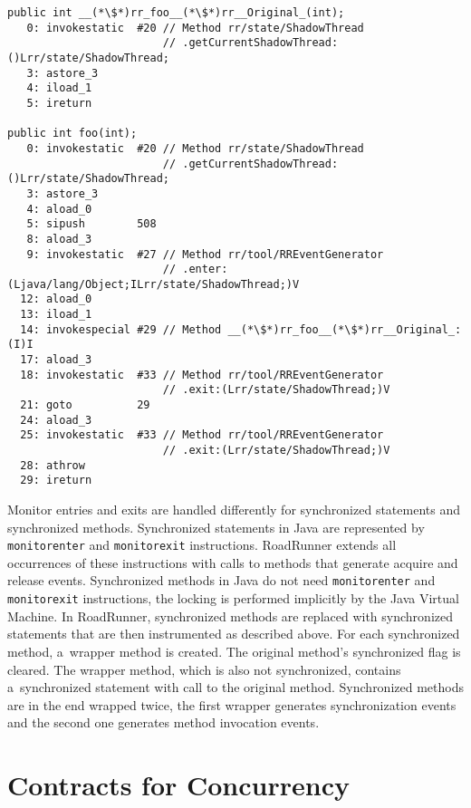 \begin{lstlisting}[label=rrInstMethod, float, caption={Method \texttt{int
foo(int a)} instrumented by RoadRunner. The original method was renamed to
\texttt{\_\_\$rr\_foo\_\_\$rr\_\_Original\_} and a~new method with the original
name was created. This method generates enter and exit events and calls the
original method.}]
public int __(*\$*)rr_foo__(*\$*)rr__Original_(int);
   0: invokestatic  #20 // Method rr/state/ShadowThread
                        // .getCurrentShadowThread:()Lrr/state/ShadowThread;
   3: astore_3
   4: iload_1
   5: ireturn

public int foo(int);
   0: invokestatic  #20 // Method rr/state/ShadowThread
                        // .getCurrentShadowThread:()Lrr/state/ShadowThread;
   3: astore_3
   4: aload_0
   5: sipush        508
   8: aload_3
   9: invokestatic  #27 // Method rr/tool/RREventGenerator
                        // .enter:(Ljava/lang/Object;ILrr/state/ShadowThread;)V
  12: aload_0
  13: iload_1
  14: invokespecial #29 // Method __(*\$*)rr_foo__(*\$*)rr__Original_:(I)I
  17: aload_3
  18: invokestatic  #33 // Method rr/tool/RREventGenerator
                        // .exit:(Lrr/state/ShadowThread;)V
  21: goto          29
  24: aload_3
  25: invokestatic  #33 // Method rr/tool/RREventGenerator
                        // .exit:(Lrr/state/ShadowThread;)V
  28: athrow
  29: ireturn\end{lstlisting}

Monitor entries and exits are handled differently for synchronized statements
and synchronized methods. Synchronized statements in Java are represented by
\texttt{monitorenter} and \texttt{monitorexit} instructions. RoadRunner extends
all occurrences of these instructions with calls to methods that generate
acquire and release events. Synchronized methods in Java do not need
\texttt{monitorenter} and \texttt{monitorexit} instructions, the locking is
performed implicitly by the Java Virtual Machine. In RoadRunner, synchronized
methods are replaced with synchronized statements that are then instrumented as
described above. For each synchronized method, a~wrapper method is created. The
original method's synchronized flag is cleared. The wrapper method, which is
also not synchronized, contains a~synchronized statement with call to the
original method. Synchronized methods are in the end wrapped twice, the first
wrapper generates synchronization events and the second one generates method
invocation events.

\chapter{Contracts for Concurrency}
\label{chThree}

